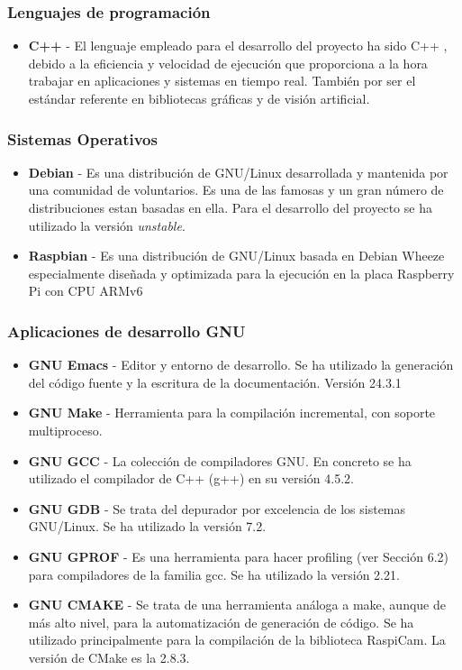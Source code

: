 \subsubsection{Lenguajes de programación}
\begin{itemize}
\item \textbf{C++} - El lenguaje empleado para el desarrollo del proyecto ha sido C++ \cite{Stroustrup00}, debido a la eficiencia y velocidad de ejecución que proporciona a la hora trabajar en aplicaciones y sistemas en tiempo real. También por ser el estándar referente en bibliotecas gráficas y de visión artificial.
\end{itemize}

\subsubsection{Sistemas Operativos}
\begin{itemize}
\item \textbf{Debian} - Es una distribución de GNU/Linux desarrollada y mantenida por una comunidad de voluntarios. Es una de las famosas y un gran número de distribuciones estan basadas en ella. Para el desarrollo del proyecto se ha utilizado la versión \emph{unstable}. 

\item \textbf{Raspbian} - Es una distribución de GNU/Linux basada en Debian Wheeze especialmente diseñada y optimizada para la ejecución en la placa Raspberry Pi con  CPU ARMv6   
\end{itemize}

\subsubsection{Aplicaciones de desarrollo GNU}
\begin{itemize}
\item \textbf{GNU Emacs} - Editor y entorno de desarrollo. Se ha utilizado la generación del código fuente y la escritura de la documentación. Versión 24.3.1
\item \textbf{GNU Make} - Herramienta para la compilación incremental, con soporte multiproceso.
\item \textbf{GNU GCC} - La colección de compiladores GNU. En concreto se ha utilizado el compilador de C++ (g++) en su versión 4.5.2.
\item \textbf{GNU GDB} - Se trata del depurador por excelencia de los sistemas GNU/Linux. Se ha utilizado la versión 7.2.
\item \textbf{GNU GPROF} - Es una herramienta para hacer profiling (ver Sección 6.2) para compiladores de la familia gcc. Se ha utilizado la versión 2.21.
\item \textbf{GNU CMAKE} - Se trata de una herramienta análoga a make, aunque de más alto nivel, para la automatización de generación de código. Se ha utilizado principalmente para la compilación de la biblioteca RaspiCam. La versión de CMake es la 2.8.3. 
\end{itemize}


